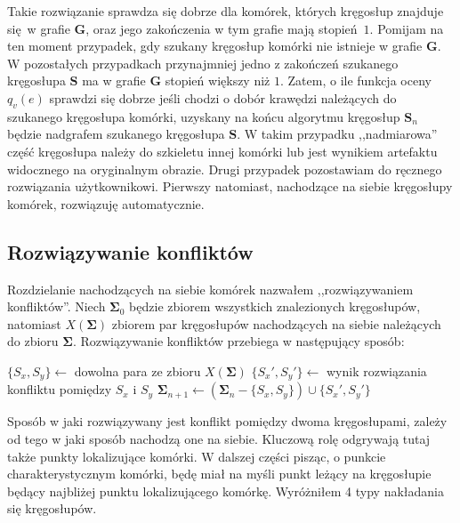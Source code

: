 \documentclass[declaration,shortabstract,mgr]{iithesis}
\begin{document}
Takie rozwiązanie sprawdza się dobrze dla komórek, których kręgosłup znajduje się w grafie $\mathbf{G}$, oraz jego zakończenia w tym grafie mają stopień $1$. Pomijam na ten moment przypadek, gdy szukany kręgosłup komórki nie istnieje w grafie $\mathbf{G}$. W pozostałych przypadkach przynajmniej jedno z zakończeń szukanego kręgosłupa $\mathbf{S}$ ma w grafie $\mathbf{G}$ stopień większy niż $1$. Zatem, o ile funkcja oceny $q_v(e)$ sprawdzi się dobrze jeśli chodzi o dobór krawędzi należących do szukanego kręgosłupa komórki, uzyskany na końcu algorytmu kręgosłup $\mathbf{S}_n$ będzie nadgrafem szukanego kręgosłupa $\mathbf{S}$. W takim przypadku ,,nadmiarowa'' część kręgosłupa należy do szkieletu innej komórki lub jest wynikiem artefaktu widocznego na oryginalnym obrazie. Drugi przypadek pozostawiam do ręcznego rozwiązania użytkownikowi. Pierwszy natomiast, nachodzące na siebie kręgosłupy komórek, rozwiązuję automatycznie.

\subsection{Rozwiązywanie konfliktów}
\label{sec:fix-conflicts}

Rozdzielanie nachodzących na siebie komórek nazwałem ,,rozwiązywaniem konfliktów''. Niech $\mathbf{\Sigma}_0$ będzie zbiorem wszystkich znalezionych kręgosłupów, natomiast $X(\mathbf{\Sigma})$ zbiorem par kręgosłupów nachodzących na siebie należących do zbioru $\mathbf{\Sigma}$. Rozwiązywanie konfliktów przebiega w następujący sposób:

\begin{algorithm}[H]
\begin{algorithmic}

  \STATE $\{S_x, S_y\} \gets$ dowolna para ze zbioru $X(\mathbf{\Sigma})$
  \STATE $\{S_x', S_y'\} \gets$ wynik rozwiązania konfliktu pomiędzy $S_x$ i $S_y$
  \STATE $\mathbf{\Sigma}_{n+1} \gets (\mathbf{\Sigma}_n - \{S_x, S_y\}) \cup \{S_x', S_y'\}$
\ENDWHILE

\end{algorithmic}
\end{algorithm}

Sposób w jaki rozwiązywany jest konflikt pomiędzy dwoma kręgosłupami, zależy od tego w jaki sposób nachodzą one na siebie. Kluczową rolę odgrywają tutaj także punkty lokalizujące komórki. W dalszej części pisząc, o punkcie charakterystycznym komórki, będę miał na myśli punkt leżący na kręgosłupie będący najbliżej punktu lokalizującego komórkę. Wyróżniłem 4 typy nakładania się kręgosłupów.
\end{document}

